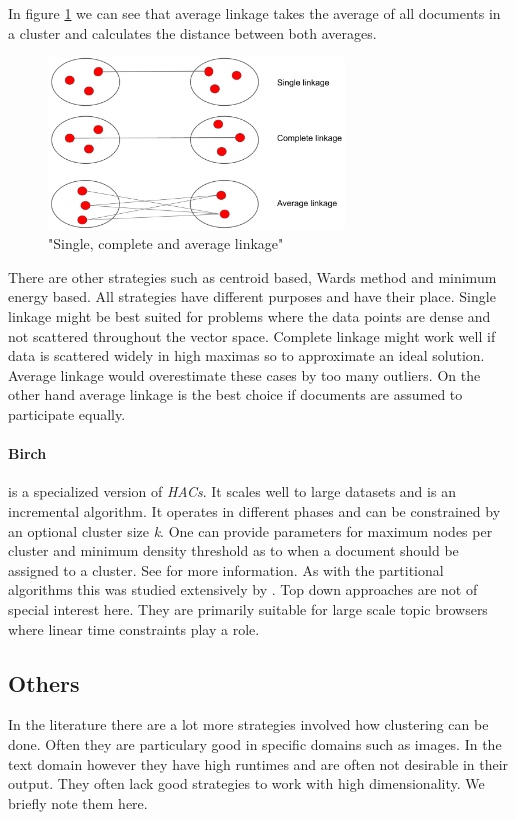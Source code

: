     In figure \ref{linkage_strategy} we can see that average linkage takes the average of all documents in a cluster and calculates the distance between both averages.

    \begin{figure}[h!]
      \centering
        \includegraphics[width=0.7\textwidth]{linkage_strategy.png}
        \caption{"Single, complete and average linkage"}
        \label{linkage_strategy}
    \end{figure}

    There are other strategies such as centroid based, Wards method and minimum energy based.
    All strategies have different purposes and have their place. Single linkage might be best suited for problems where the data points are dense and not scattered throughout the vector space. Complete linkage might work well if data is scattered widely in high maximas so to approximate an ideal solution. Average linkage would overestimate these cases by too many outliers. On the other hand average linkage is the best choice if documents are assumed to  participate equally. 
    \paragraph{Birch} is a specialized version of \emph{HACs}. It scales well to large datasets and is an incremental algorithm. It operates in different phases and can be constrained by an optional cluster size \emph{k}. One can provide parameters for maximum nodes per cluster and minimum density threshold as to when a document should be assigned to a cluster. See 
    \cite{BIRCH1996} for more information. As with the partitional algorithms this was studied extensively by \cite{ClusteringBooAggarwalk2013, ClusterAlgoSurveyIBM, IRBook2008}. Top down approaches are not of special interest here. They are primarily suitable for large scale topic browsers where linear time constraints play a role.

    \subsection{Others}
    In the literature there are a lot more strategies involved how clustering can be done. Often they are particulary good in specific domains such as images. In the text domain however they have high runtimes and are often not desirable in their output. They often lack good strategies to work with high dimensionality. We briefly note them here.

